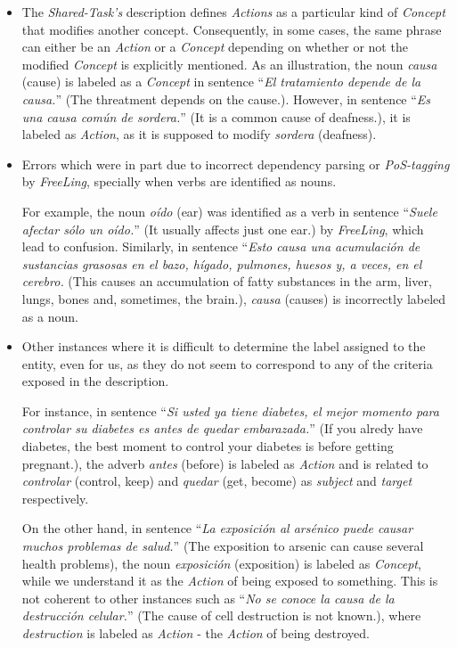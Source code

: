 \documentclass[a4paper,11pt,twocolumn,twoside]{article}
\begin{document}
\begin{itemize}
    \item The \emph{Shared-Task's} description defines \emph{Actions} as a particular kind of \emph{Concept} that modifies another concept. Consequently, in some cases, the same phrase can either be an \emph{Action} or a \emph{Concept} depending on whether or not the modified \emph{Concept} is explicitly mentioned.
    As an illustration, the noun \emph{causa} (cause) is labeled as a \emph{Concept} in sentence ``\emph{El tratamiento depende de la causa.}'' (The threatment depends on the cause.). However, in sentence ``\emph{Es una causa común de sordera.}'' (It is a common cause of deafness.), it is labeled as \emph{Action}, as it is supposed to modify \emph{sordera} (deafness).
    \item Errors which were in part due to incorrect dependency parsing or \emph{PoS-tagging} by \emph{FreeLing}, specially when verbs are identified as nouns.
    
    For example, the noun \emph{oído} (ear) was identified as a verb in sentence ``\emph{Suele afectar sólo un oído.}'' (It usually affects just one ear.) by \emph{FreeLing}, which lead to confusion.
    Similarly, in sentence ``\emph{Esto causa una acumulación de sustancias grasosas en el bazo, hígado, pulmones, huesos y, a veces, en el cerebro.} (This causes an accumulation of fatty substances in the arm, liver, lungs, bones and, sometimes, the brain.), \emph{causa} (causes) is incorrectly labeled as a noun.
    \item Other instances where it is difficult to determine the label assigned to the entity, even for us, as they do not seem to correspond to any of the criteria exposed in the description. 
    
    For instance, in sentence ``\emph{Si usted ya tiene diabetes, el mejor momento para controlar su diabetes es antes de quedar embarazada.}'' (If you alredy have diabetes, the best moment to control your diabetes is before getting pregnant.), the adverb \emph{antes} (before) is labeled as \emph{Action} and is related to \emph{controlar} (control, keep) and \emph{quedar} (get, become) as \emph{subject} and \emph{target} respectively.
    
    On the other hand, in sentence ``\emph{La exposición al arsénico puede causar muchos problemas de salud.}'' (The exposition to arsenic can cause several health problems), the noun \emph{exposición} (exposition) is labeled as \emph{Concept}, while we understand it as the \emph{Action} of being exposed to something. This is not coherent to other instances such as ``\emph{No se conoce la causa de la destrucción celular.}'' (The cause of cell destruction is not known.), where \emph{destruction} is labeled as \emph{Action} - the \emph{Action} of being destroyed.
    \end{itemize}
    
\end{document}
